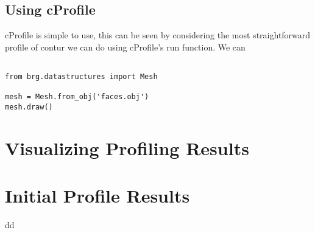 \subsection{Using cProfile}
cProfile is simple to use, this can be seen by considering the most straightforward profile of contur we can do using cProfile's run function. We can 

\begin{verbatim}

from brg.datastructures import Mesh
 
mesh = Mesh.from_obj('faces.obj')
mesh.draw()
\end{verbatim}

\section{Visualizing Profiling Results}

\section{Initial Profile Results}
dd
